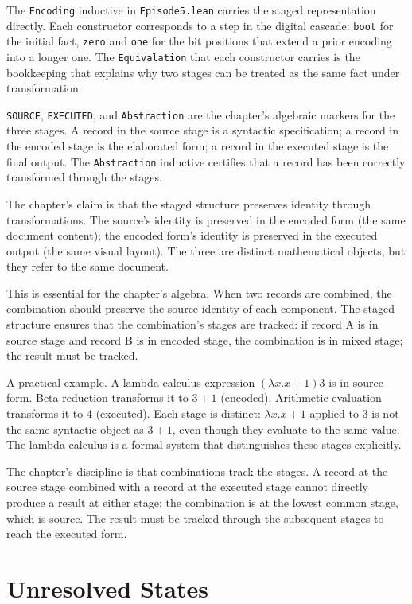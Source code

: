 The \texttt{Encoding} inductive in \texttt{Episode5.lean} carries
the staged representation directly. Each constructor corresponds
to a step in the digital cascade: \texttt{boot} for the initial
fact, \texttt{zero} and \texttt{one} for the bit positions that
extend a prior encoding into a longer one. The \texttt{Equivalation}
that each constructor carries is the bookkeeping that explains why
two stages can be treated as the same fact under transformation.

\texttt{SOURCE}, \texttt{EXECUTED}, and \texttt{Abstraction} are
the chapter's algebraic markers for the three stages. A record
in the source stage is a syntactic specification; a record in
the encoded stage is the elaborated form; a record in the
executed stage is the final output. The \texttt{Abstraction}
inductive certifies that a record has been correctly transformed
through the stages.

The chapter's claim is that the staged structure preserves
identity through transformations. The source's identity is
preserved in the encoded form (the same document content); the
encoded form's identity is preserved in the executed output
(the same visual layout). The three are distinct mathematical
objects, but they refer to the same document.

This is essential for the chapter's algebra. When two records are
combined, the combination should preserve the source identity of
each component. The staged structure ensures that the
combination's stages are tracked: if record A is in source stage
and record B is in encoded stage, the combination is in mixed
stage; the result must be tracked.

A practical example. A lambda calculus expression $(\lambda x. x +
1) 3$ is in source form. Beta reduction transforms it to $3 + 1$
(encoded). Arithmetic evaluation transforms it to $4$ (executed).
Each stage is distinct: $\lambda x. x + 1$ applied to $3$ is not
the same syntactic object as $3 + 1$, even though they evaluate
to the same value. The lambda calculus is a formal system that
distinguishes these stages explicitly.

The chapter's discipline is that combinations track the stages. A
record at the source stage combined with a record at the
executed stage cannot directly produce a result at either stage;
the combination is at the lowest common stage, which is source.
The result must be tracked through the subsequent stages to
reach the executed form.

\section{Unresolved States}
\label{se:unresolved-states}

